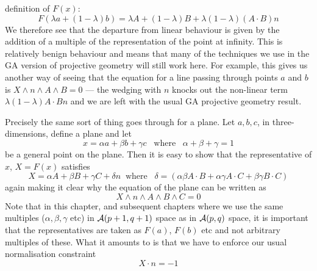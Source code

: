 definition of $F(x)$:
%
\begin{equation}
F(\lambda a + (1-\lambda)b) = \lambda A + (1-\lambda)B +
\lambda(1-\lambda)(A\cdot B) n \label{lincomb}
\end{equation}
%
We therefore see that the departure from linear behaviour
is given by the addition of a multiple of the representation of the point at
infinity. This is relatively benign behaviour and means
that many of the techniques we use in the GA version of
projective geometry will still work here. For example,
this gives us another way of seeing that the equation for
a line passing through points $a$ and $b$ is $X\wedge n
\wedge A\wedge B=0$ --- the wedging with $n$ knocks out the
non-linear term $\lambda(1-\lambda)A\cdot B n $ and we are
left with the usual GA projective geometry result.

Precisely the same sort of thing goes through for a
plane. Let $a,b,c$, in three-dimensions,  define a plane and let
%
\[ x = \alpha a + \beta b + \gamma c \;\;\; \mbox{where}\;\;\; \alpha + \beta + \gamma = 1  \]
%
be a general point on the plane. Then it is easy to show
that the representative of $x$, $X=F(x)$ satisfies
%
\begin{equation}
   X = \alpha A + \beta B + \gamma C + \delta n \;\;\mbox{where}\;\;\; \delta = (\alpha\beta A\cdot B + \alpha \gamma A\cdot C + \beta\gamma B\cdot C)
\end{equation}
%
again making it clear why the equation of the plane
can be written as
%
\[ X\wedge  n \wedge A \wedge B \wedge C =0 \]
%
Note that in this chapter, and subsequent chapters  where
we use the same multiples ($\alpha, \beta, \gamma$ etc)
in ${\mathcal{A}}(p+1,q+1)$ space as in ${\mathcal{A}}(p,q)$ space,
it is important that the representatives are taken as
$F(a)$, $F(b)$ etc and not arbitrary multiples of these.
What it amounts to is that we have to enforce
our usual normalisation constraint
%
\begin{equation}
 X\cdot n  = -1
 \end{equation}
 
